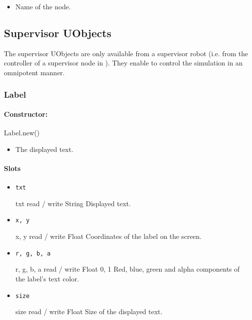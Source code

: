 \begin{itemize}
\item {} Name of the \webots node.
\end{itemize}

\subsection{Supervisor \api UObjects}
\label{sec:webots:supervisor}

The supervisor UObjects are only available from a supervisor robot
(i.e. from the controller of a supervisor node in \webots). They
enable to control the simulation in an omnipotent manner.

\subsubsection{Label}

\paragraph{Constructor:} Label.new()

\begin{itemize}
\item {} The displayed text.
\end{itemize}

\paragraph{Slots}

\begin{itemize}
\item \lstinline{txt}
\begin{attribute}{txt}
  {read / write}
  {String}
  {}
  Displayed text.
\end{attribute}
\item \lstinline{x, y}
\begin{attribute}{x, y}
  {read / write}
  {Float}
  {}
  Coordinates of the label on the screen.
\end{attribute}
\item \lstinline{r, g, b, a}
\begin{attribute}{r, g, b, a}
  {read / write}
  {Float}
  {0, 1}
  Red, blue, green and alpha components of the label's text color.
\end{attribute}
\item \lstinline{size}
\begin{attribute}{size}
  {read / write}
  {Float}
  {}
  Size of the displayed text.
\end{attribute}
\end{itemize}

